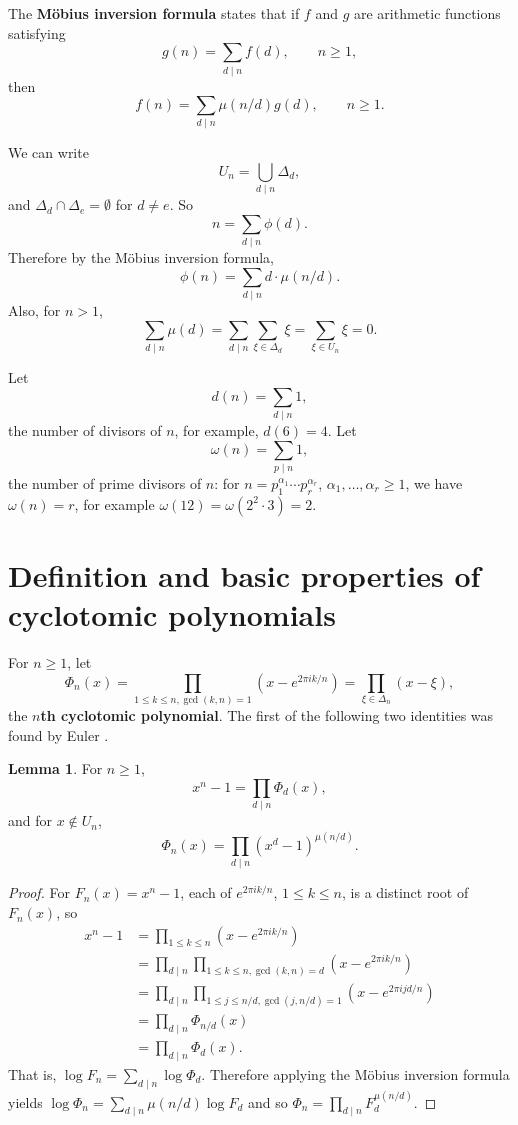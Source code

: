 \documentclass{article}
\theoremstyle{definition}
\newtheorem{lemma}[theorem]{Lemma}
\theoremstyle{definition}
\begin{document}
The \textbf{M\"obius inversion formula} states that if $f$ and $g$ are arithmetic functions satisfying
\[
g(n) = \sum_{d \mid n} f(d),\qquad n \geq 1,
\]
then
\[
f(n) = \sum_{d \mid n} \mu(n/d) g(d), \qquad n \geq 1.
\]

We can write
\[
U_n = \bigcup_{d \mid n} \Delta_d,
\]
and $\Delta_d \cap \Delta_e = \emptyset$ for $d \neq e$. 
So
\[
n = \sum_{d \mid n} \phi(d).
\]
Therefore by the M\"obius inversion formula,
\[
\phi(n) = \sum_{d \mid n} d \cdot \mu(n/d).
\]
Also, for $n > 1$,
\begin{equation}
\sum_{d \mid n} \mu(d) = \sum_{d \mid n} \sum_{\xi \in \Delta_d} \xi = \sum_{\xi \in U_n} \xi = 0.
\label{mobiussum}
\end{equation}

Let
\[
d(n) = \sum_{d \mid n} 1,
\]
the number of divisors of $n$, for example, $d(6) = 4$. Let
\[
\omega(n)=\sum_{p \mid n} 1,
\]
the number of prime divisors of $n$: for $n=p_1^{\alpha_1} \cdots p_r^{\alpha_r}$, $\alpha_1,\ldots,\alpha_r \geq 1$,
we have $\omega(n)=r$, for example
$\omega(12)=\omega(2^2 \cdot 3) = 2$. 








\section{Definition and basic properties of cyclotomic polynomials}
For $n \geq 1$, let
\[
\Phi_n(x) =\prod_{1\le k\le n, \gcd(k,n)=1}
(x-e^{2\pi i k/n})
= \prod_{\xi \in \Delta_n} (x-\xi),
\]
the \textbf{$n$th cyclotomic polynomial}.
The first of the following two identities was found by Euler \cite[pp.~199--200, Chap. III, \S VI]{weil}.

\begin{lemma}
For $n \geq 1$,
\[
x^n-1 = \prod_{d \mid n} \Phi_d(x),
\]
and for $x \not \in U_n$,
\[
\Phi_n(x) = \prod_{d \mid n} (x^d-1)^{\mu(n/d)}.
\]
\label{mobiuslemma}
\end{lemma}
\begin{proof}
For $F_n(x) = x^n-1$, 
each of $e^{2\pi ik/n}$, $1 \leq k \leq n$, is a distinct root of $F_n(x)$, so
\begin{align*}
x^n-1 &= \prod_{1 \leq k \leq n} (x-e^{2\pi ik/n}) \\
&=\prod_{d \mid n} \prod_{1\le k\le n, \gcd(k,n)=d}
(x-e^{2\pi i k/n})\\
&=\prod_{d \mid n}\prod_{1\le j \le n/d, \gcd(j,n/d)=1} (x-e^{2\pi ijd/n})\\
&=\prod_{d \mid n} \Phi_{n/d}(x)\\
&=\prod_{d \mid n} \Phi_d(x).
\end{align*}
That is, $\log F_n = \sum_{d \mid n} \log \Phi_d$. Therefore applying the M\"obius inversion formula yields
$\log \Phi_n = \sum_{d \mid n} \mu(n/d) \log F_d$ and so
$\Phi_n = \prod_{d \mid n} F_{d}^{\mu(n/d)}$.
\end{proof}
\end{document}
